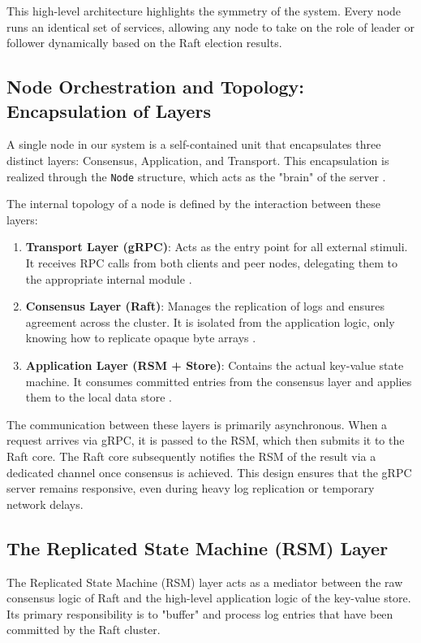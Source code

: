 This high-level architecture highlights the symmetry of the system.
Every node runs an identical set of services, allowing any node to take on the role of leader or follower dynamically based on the Raft election results.

\subsection{Node Orchestration and Topology: Encapsulation of Layers}
A single node in our system is a self-contained unit that encapsulates three distinct layers: Consensus, Application, and Transport. This encapsulation is realized through the \texttt{Node} structure, which acts as the "brain" of the server \cite{node_go}.

The internal topology of a node is defined by the interaction between these layers:
\begin{enumerate}
    \item \textbf{Transport Layer (gRPC)}: Acts as the entry point for all external stimuli. It receives RPC calls from both clients and peer nodes, delegating them to the appropriate internal module \cite{node_go}.
    \item \textbf{Consensus Layer (Raft)}: Manages the replication of logs and ensures agreement across the cluster. It is isolated from the application logic, only knowing how to replicate opaque byte arrays \cite{Raft2014}.
    \item \textbf{Application Layer (RSM + Store)}: Contains the actual key-value state machine. It consumes committed entries from the consensus layer and applies them to the local data store \cite{rsm_go}.
\end{enumerate}

The communication between these layers is primarily asynchronous.
When a request arrives via gRPC, it is passed to the RSM, which then submits it to the Raft core. The Raft core subsequently notifies the RSM of the result via a dedicated channel once consensus is achieved. This design ensures that the gRPC server remains responsive, even during heavy log replication or temporary network delays.

\subsection{The Replicated State Machine (RSM) Layer}
The Replicated State Machine (RSM) layer acts as a mediator between the raw consensus logic of Raft and the high-level application logic of the key-value store. Its primary responsibility is to "buffer" and process log entries that have been committed by the Raft cluster.

